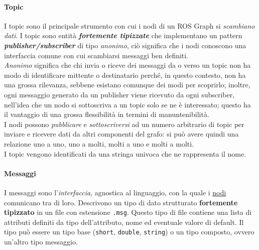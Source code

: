 \paragraph{Topic \cite{undr-topics, ros-topics}}
\label{ros:topics}
I topic sono il principale strumento con cui i nodi di un ROS Graph si \textit{scambiano dati}.
I topic sono entità \textbf{\textit{fortemente tipizzate}} che implementano
un pattern \textbf{\textit{publisher/subscriber}} di tipo \textit{anonimo}, ciò significa
che i nodi conoscono una interfaccia comune con cui scambiarsi messaggi ben definiti.\\
\textit{Anonimo} significa che chi invia o riceve dei messaggi da o verso un topic
non ha modo di identificare mittente o destinatario perché, in questo contesto, non ha una grossa rilevanza,
sebbene esistano comunque dei modi per scoprirlo; inoltre, ogni messaggio generato da un publisher
viene ricevuto da ogni subscriber, nell'idea che un nodo si sottoscriva a un topic solo se ne è
interessato; questo ha il vantaggio di una grossa flessibilità in termini di manuntenibilità.\\
I nodi possono \textit{pubblicare} e \textit{sottoscriversi} ad un numero arbitrario di topic
per inviare e ricevere dati da altri componenti del grafo: si può avere quindi una relazione uno a
uno, uno a molti, molti a uno e molti a molti.\\
I topic vengono identificati da una stringa univoca che ne rappresenta il nome.

\paragraph{Messaggi \cite{ros-message}}
\label{ros:msgs}
I messaggi sono l'\textit{interfaccia}, agnostica al linguaggio, con la quale i \hyperref[ros:nodes]{nodi}
comunicano tra di loro. Descrivono un tipo di dato strutturato \textbf{fortemente tipizzato} in un
file con estensione \verb|.msg|. Questo tipo di file contiene una lista di attributi definiti da
tipo dell'attributo, nome ed eventuale valore di default. Il tipo può essere un tipo base
(\verb|short|, \verb|double|, \verb|string|) o un tipo composto, ovvero un'altro tipo messaggio.

